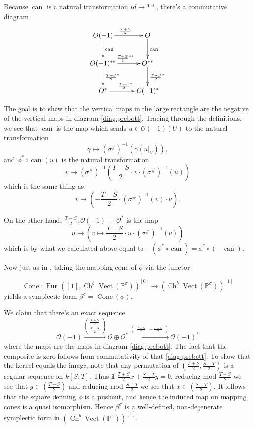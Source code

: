 \documentclass[edeposit,fullpage]{uiucthesis2009}
\newcommand{\mbb}{\mathbb}
\newcommand{\mc}{\mathcal}
\DeclareMathOperator{\can}{can}
\DeclareMathOperator{\Ch}{Ch}
\DeclareMathOperator{\Fun}{Fun}
\DeclareMathOperator{\Vect}{Vect}
\DeclareMathOperator{\Cone}{Cone}
\theoremstyle{plain}
\numberwithin{lemma}{section}
\theoremstyle{definition}
\begin{document}
Because $\can$ is a natural transformation $id \rightarrow \ast\ast$,
there's a commutative diagram
\[
\xymatrix{O(-1) \ar[d]^{\can} \ar[r]^{\frac{T+S}{2}} & O \ar[d]^{\can}
  \\ O(-1)^{\ast\ast} \ar[r]^{\frac{T+S}{2}^{\ast\ast}}
  \ar[d]^{\frac{T-S}{2}^\ast} & \ar[d]^{\frac{T-S}{2}^\ast}  O^{\ast\ast}
\\O^{\ast} \ar[r]^{\frac{T+S}{2}^{\ast}} & O(-1)^{\ast}
}
\]

The goal is to show that the vertical maps in the large rectangle are
the negative of the vertical maps in diagram \ref{diag:prebott}.
Tracing
through the definitions, we see that $\can$ is the map which sends $u
\in \mc O(-1)(U)$ to the natural transformation
\[
\gamma \mapsto (\sigma^\#)^{-1}(\gamma(u|_V)),
\]
and $\phi^* \circ \can (u)$ is the natural transformation
\[
v \mapsto (\sigma^\#)^{-1}\left(\frac{T-S}{2} \cdot v \cdot (\sigma^\#)^{-1}(u)\right)
\]
which is the same thing as
\[
v \mapsto \left(-\frac{T-S}{2} \cdot (\sigma^\#)^{-1} (v) \cdot u\right).
\]

On the other hand, $\frac{T-S}{2} :
\mc O(-1) \rightarrow \mc O^*$ is the map
\[
u \mapsto (v \mapsto \frac{T-S}{2} \cdot u \cdot (\sigma^\#)^{-1}(v))
\]
which is by what we calculated above equal to $-(\phi^* \circ \can) =
\phi^* \circ (-\can)$.

Now just as in \cite{Schder}, taking the mapping cone of $\phi$ via
the functor

\[
\Cone : \Fun([1],\Ch^b\Vect(\mbb P^\sigma))^{[0]} \rightarrow
\left(\Ch^b\Vect(\mathbb P^\sigma)\right)^{[1]}
\]
yields a symplectic form $\beta^\sigma = \Cone(\phi)$. 

We claim that there's an exact sequence
\[
\mc O(-1) \xrightarrow{\begin{pmatrix}\frac{T+S}{2} \\ \frac{T-S}{2} \end{pmatrix}} \mc O \oplus \mc O^* \xrightarrow{\begin{pmatrix}\frac{T+S}{2} & -\frac{T-S}{2} \end{pmatrix}} \mc O(-1)^*
\]
where the maps are the maps in diagram \ref{diag:prebott}. The fact
that the composite is zero follows from commutativity of that
\ref{diag:prebott}. To show that the kernel equals the image, note
that any permutation of $(\frac{T+S}{2},\frac{S-T}{2})$ is a regular sequence on
$k[S,T]$. Thus if  $\frac{T+S}{2}x + \frac{S-T}{2}y = 0$, reducing mod
$\frac{T+S}{2}$ we see that $y \in (\frac{T+S}{2})$ and reducing mod
$\frac{S-T}{2}$ we see that $x \in (\frac{S-T}{2})$. It follows that the square defining $\phi$ is a pushout, and hence the induced map on
mapping cones is a quasi isomorphism. Hence $\beta^\sigma$
is a well-defined, non-degenerate symplectic form in
$\left(\Ch^b\Vect(\mathbb P^\sigma)\right)^{[1]}$. 
\end{document}
